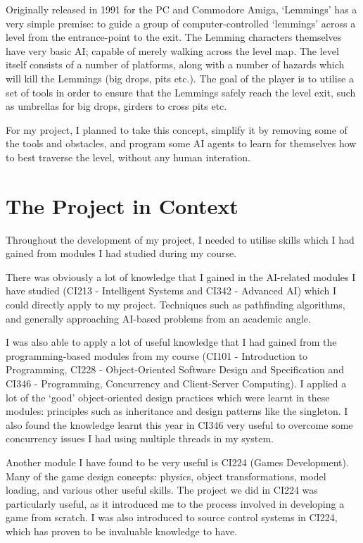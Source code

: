 \documentclass[a4paper,oneside]{report}
\begin{document}
Originally released in 1991 for the PC and Commodore Amiga, `Lemmings' has a very simple premise: to guide a group of computer-controlled `lemmings’ across a level from the entrance-point to the exit. The Lemming characters themselves have very basic AI; capable of merely walking across the level map. The level itself consists of a number of platforms, along with a number of hazards which will kill the Lemmings (big drops, pits etc.). The goal of the player is to utilise a set of tools in order to ensure that the Lemmings safely reach the level exit, such as umbrellas for big drops, girders to cross pits etc. 

For my project, I planned to take this concept, simplify it by removing some of the tools and obstacles, and program some AI agents to learn for themselves how to best traverse the level, without any human interation.
		
\section{The Project in Context}
	
Throughout the development of my project, I needed to utilise skills which I had gained from modules I had studied during my course.

There was obviously a lot of knowledge that I gained in the AI-related modules I have studied (CI213 - Intelligent Systems and CI342 - Advanced AI) which I could directly apply to my project. Techniques such as pathfinding algorithms, and generally approaching AI-based problems from an academic angle.

I was also able to apply a lot of useful knowledge that I had gained from the programming-based modules from my course (CI101 - Introduction to Programming, CI228 - Object-Oriented Software Design and Specification and CI346 - Programming, Concurrency and Client-Server Computing). I applied a lot of the `good' object-oriented design practices which were learnt in these modules: principles such as inheritance and design patterns like the singleton. I also found the knowledge learnt this year in CI346 very useful to overcome some concurrency issues I had using multiple threads in my system.

Another module I have found to be very useful is CI224 (Games Development). Many of the game design concepts: physics, object transformations, model loading, and various other useful skills. The project we did in CI224 was particularly useful, as it introduced me to the process involved in developing a game from scratch. I was also introduced to source control systems in CI224, which has proven to be invaluable knowledge to have.
\end{document}
